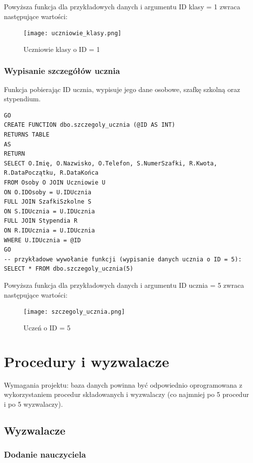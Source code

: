 \documentclass[60pt]{article}
\begin{document}
Powyższa funkcja dla przykładowych danych i argumentu ID klasy = 1 zwraca następujące wartości:

\begin{figure}[h]
  \texttt{[image: uczniowie\_klasy.png]}
  \caption{Uczniowie klasy o ID = 1}
  \label{Uczniowie klasy o ID = 1}
\end{figure}

\subsubsection{Wypisanie szczegółów ucznia}

Funkcja pobierając ID ucznia, wypisuje jego dane osobowe, szafkę szkolną oraz stypendium. 

\begin{verbatim}
GO
CREATE FUNCTION dbo.szczegoly_ucznia (@ID AS INT)
RETURNS TABLE
AS
RETURN
SELECT O.Imię, O.Nazwisko, O.Telefon, S.NumerSzafki, R.Kwota, R.DataPoczątku, R.DataKońca
FROM Osoby O JOIN Uczniowie U
ON O.IDOsoby = U.IDUcznia
FULL JOIN SzafkiSzkolne S
ON S.IDUcznia = U.IDUcznia
FULL JOIN Stypendia R
ON R.IDUcznia = U.IDUcznia
WHERE U.IDUcznia = @ID
GO
-- przykładowe wywołanie funkcji (wypisanie danych ucznia o ID = 5):
SELECT * FROM dbo.szczegoly_ucznia(5)
\end{verbatim}

Powyższa funkcja dla przykładowych danych i argumentu ID ucznia = 5 zwraca następujące wartości:

\begin{figure}[h]
  \texttt{[image: szczegoly\_ucznia.png]}
  \caption{Uczeń o ID = 5}
  \label{Uczeń o ID = 5}
\end{figure}


\newpage

\section{Procedury i wyzwalacze}

Wymagania projektu: baza danych powinna być odpowiednio oprogramowana z wykorzystaniem procedur składowanych i wyzwalaczy (co najmniej po 5 procedur i po 5 wyzwalaczy).

\subsection{Wyzwalacze}

\subsubsection{Dodanie nauczyciela}
\end{document}
